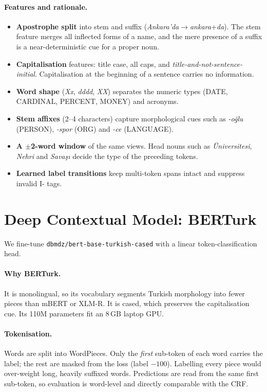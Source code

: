 \documentclass[11pt]{article}
\begin{document}
\paragraph{Features and rationale.}
\begin{itemize}
\item \textbf{Apostrophe split} into stem and suffix (\textit{Ankara'da}$\to$\textit{ankara}+\textit{da}). The stem feature merges all inflected forms of a name, and the mere presence of a suffix is a near-deterministic cue for a proper noun.
\item \textbf{Capitalisation} features: title case, all caps, and \textit{title-and-not-sentence-initial}. Capitalisation at the beginning of a sentence carries no information.
\item \textbf{Word shape} (\textit{Xx}, \textit{dddd}, \textit{XX}) separates the numeric types (DATE, CARDINAL, PERCENT, MONEY) and acronyms.
\item \textbf{Stem affixes} (2--4 characters) capture morphological cues such as \textit{-oğlu} (PERSON), \textit{-spor} (ORG) and \textit{-ce} (LANGUAGE).
\item \textbf{A $\pm$2-word window} of the same views. Head nouns such as \textit{Üniversitesi}, \textit{Nehri} and \textit{Savaşı} decide the type of the preceding tokens.
\item \textbf{Learned label transitions} keep multi-token spans intact and suppress invalid I- tags.
\end{itemize}

\section{Deep Contextual Model: BERTurk}
We fine-tune \texttt{dbmdz/bert-base-turkish-cased} \citep{schweter2020berturk} with a linear token-classification head.

\paragraph{Why BERTurk.} It is monolingual, so its vocabulary segments Turkish morphology into fewer pieces than mBERT or XLM-R. It is cased, which preserves the capitalisation cue. Its 110M parameters fit an 8\,GB laptop GPU.

\paragraph{Tokenisation.} Words are split into WordPieces. Only the \emph{first} sub-token of each word carries the label; the rest are masked from the loss (label $-100$). Labelling every piece would over-weight long, heavily suffixed words. Predictions are read from the same first sub-token, so evaluation is word-level and directly comparable with the CRF.
\end{document}
